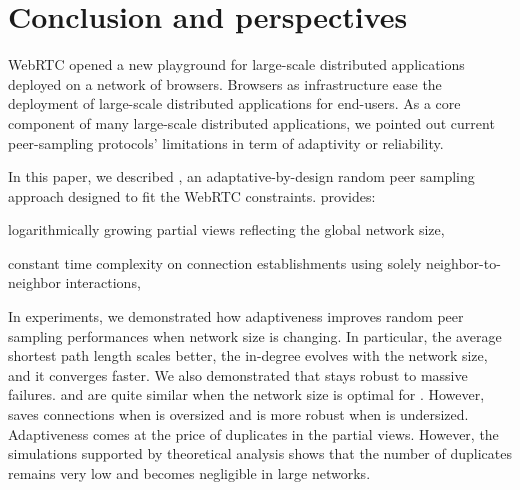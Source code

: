 
\section{Conclusion and perspectives}
\label{sec:conclusion}

WebRTC opened a new playground for large-scale distributed applications
deployed on a network of browsers. Browsers as infrastructure ease the
deployment of large-scale distributed applications for end-users. As a core
component of many large-scale distributed applications, we pointed out current
peer-sampling protocols' limitations in term of adaptivity or reliability.

In this paper, we described \SPRAY, an adaptative-by-design random peer
sampling approach designed to fit the WebRTC constraints.  \SPRAY provides:
\begin{inparaenum}[(i)]
\item logarithmically growing partial views reflecting the global network size,
\item constant time complexity on connection establishments using solely
  neighbor-to-neighbor interactions,
\end{inparaenum}

In experiments, we demonstrated how \SPRAY adaptiveness improves random peer
sampling performances when network size is changing. In particular, the average
shortest path length scales better, the in-degree evolves with the network
size, and it converges faster.  We also demonstrated that \SPRAY stays robust
to massive failures. \SPRAY and \CYCLON are quite similar when the network size
is optimal for \CYCLON. However, \SPRAY saves connections when \CYCLON is
oversized and is more robust when \CYCLON is undersized. Adaptiveness comes at
the price of duplicates in the partial views. However, the simulations
supported by theoretical analysis shows that the number of duplicates remains
very low and becomes negligible in large networks.




